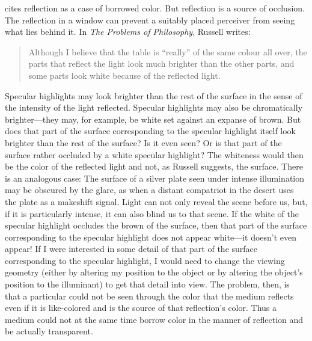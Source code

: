 \citet{Sorabji:2004fk} cites reflection as a case of borrowed color. But reflection is a source of occlusion. The reflection in a window can prevent a suitably placed perceiver from seeing what lies behind it. In \emph{The Problems of Philosophy}, Russell writes:
	\begin{quote}
		Although I believe that the table is ``really'' of the same colour all over, the parts that reflect the light look much brighter than the other parts, and some parts look white because of the reflected light. \citep[2]{Russell:1912uq}
	\end{quote}
Specular highlights may look brighter than the rest of the surface in the sense of the intensity of the light reflected. Specular highlights may also be chromatically brighter---they may, for example, be white set against an expanse of brown. But does that part of the surface corresponding to the specular highlight itself look brighter than the rest of the surface? Is it even seen? Or is that part of the surface rather occluded by a white specular highlight? The whiteness would then be the color of the reflected light and not, as Russell suggests, the surface. There is an analogous case: The surface of a silver plate seen under intense illumination may be obscured by the glare, as when a distant compatriot in the desert uses the plate as a makeshift signal. Light can not only reveal the scene before us, but, if it is particularly intense, it can also blind us to that scene. If the white of the specular highlight occludes the brown of the surface, then that part of the surface corresponding to the specular highlight does not appear white---it doesn't even appear! If I were interested in some detail of that part of the surface corresponding to the specular highlight, I would need to change the viewing geometry (either by altering my position to the object or by altering the object's position to the illuminant) to get that detail into view. The problem, then, is that a particular could not be seen through the color that the medium reflects even if it is like-colored and is the source of that reflection's color. Thus a medium could not at the same time borrow color in the manner of reflection and be actually transparent.

